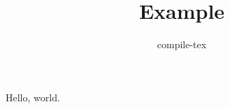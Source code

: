 \documentclass{article}
\title{Example}
\author{compile-tex}
\begin{document}
\maketitle
Hello, world.
\end{document}
